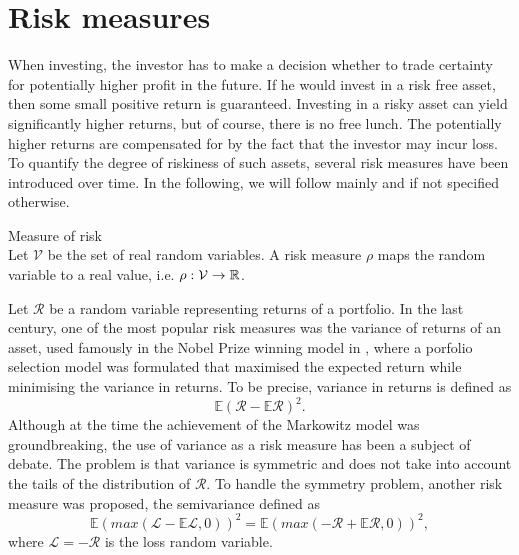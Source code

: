\chapter{Risk measures}
\label{chap2}
When investing, the investor has to make a decision whether to trade certainty for potentially higher profit in the future. If he would invest in a risk free asset, then some small positive return is guaranteed. Investing in a risky asset can yield significantly higher returns, but of course, there is no free lunch. The potentially higher returns are compensated for by the fact that the investor may incur loss. To quantify the degree of riskiness of such assets, several risk measures have been introduced over time.
In the following, we will follow mainly \cite{leoppold_risk_measures} and \cite[p. 275-278]{cornuejols_tutuncu_2006} if not specified otherwise.

\begin{defn}{\normalfont Measure of risk} \\
Let $\mathcal{V}$ be the set of real random variables. A risk measure $\rho$ maps the random variable to a real value, i.e. $\rho: \mathcal{V} \rightarrow \mathbb{R}$.
\end{defn}

Let $\mathcal{R}$ be a random variable representing returns of a portfolio. In the last century, one of the most popular risk measures was the variance of returns of an asset, used famously in the Nobel Prize winning model in \cite{markowitz}, where a porfolio selection model was formulated that maximised the expected return while minimising the variance in returns. To be precise, variance in returns is defined as
\begin{equation*}
\mathbb{E}(\mathcal{R} - \mathbb{E}\mathcal{R} )^2.
\end{equation*}
Although at the time the achievement of the Markowitz model was groundbreaking, the use of variance as a risk measure has been a subject of debate. The problem is that variance is symmetric and does not take into account the tails of the distribution of $\mathcal{R}$. To handle the symmetry problem, another risk measure was proposed, the semivariance defined as
\begin{equation*}
\mathbb{E}(max(\mathcal{L} - \mathbb{E}\mathcal{L},0))^2=\mathbb{E}(max(-\mathcal{R} + \mathbb{E}\mathcal{R},0))^2,
\end{equation*}
where $\mathcal{L}=-\mathcal{R}$ is the loss random variable.

